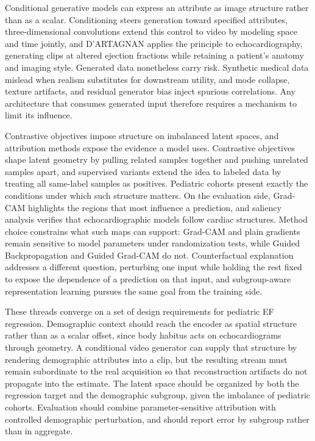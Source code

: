 \documentclass{ws-procs11x85}
\begin{document}
Conditional generative models can express an attribute as image structure rather than as a scalar.
Conditioning steers generation toward specified attributes,\cite{mirza2014conditional} three-dimensional convolutions extend this control to video by modeling space and time jointly,\cite{tran2015c3d} and D'ARTAGNAN applies the principle to echocardiography, generating clips at altered ejection fractions while retaining a patient's anatomy and imaging style.\cite{reynaud2022dartagnan}
Generated data nonetheless carry risk.
Synthetic medical data mislead when realism substitutes for downstream utility,\cite{chen2021syntheticdata} and mode collapse, texture artifacts, and residual generator bias inject spurious correlations.\cite{reynaud2023echodiffusion}
Any architecture that consumes generated input therefore requires a mechanism to limit its influence.

Contrastive objectives impose structure on imbalanced latent spaces, and attribution methods expose the evidence a model uses.
Contrastive objectives shape latent geometry by pulling related samples together and pushing unrelated samples apart,\cite{chen2020simclr} and supervised variants extend the idea to labeled data by treating all same-label samples as positives.\cite{khosla2020supcon}
Pediatric cohorts present exactly the conditions under which such structure matters.
On the evaluation side, Grad-CAM highlights the regions that most influence a prediction,\cite{selvaraju2017gradcam} and saliency analysis verifies that echocardiographic models follow cardiac structures.\cite{ghorbani2020interpretation}
Method choice constrains what such maps can support: Grad-CAM and plain gradients remain sensitive to model parameters under randomization tests, while Guided Backpropagation and Guided Grad-CAM do not.\cite{adebayo2018sanity}
Counterfactual explanation addresses a different question, perturbing one input while holding the rest fixed to expose the dependence of a prediction on that input,\cite{wachter2017counterfactual} and subgroup-aware representation learning pursues the same goal from the training side.\cite{ko2026fairhicon}

These threads converge on a set of design requirements for pediatric EF regression.
Demographic context should reach the encoder as spatial structure rather than as a scalar offset, since body habitus acts on echocardiograms through geometry.
A conditional video generator can supply that structure by rendering demographic attributes into a clip, but the resulting stream must remain subordinate to the real acquisition so that reconstruction artifacts do not propagate into the estimate.
The latent space should be organized by both the regression target and the demographic subgroup, given the imbalance of pediatric cohorts.
Evaluation should combine parameter-sensitive attribution with controlled demographic perturbation, and should report error by subgroup rather than in aggregate.
\end{document}
